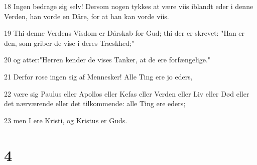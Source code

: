 \par 18 Ingen bedrage sig selv! Dersom nogen tykkes at være viis iblandt eder i denne Verden, han vorde en Dåre, for at han kan vorde viis.
\par 19 Thi denne Verdens Visdom er Dårskab for Gud; thi der er skrevet: "Han er den, som griber de vise i deres Træskhed;"
\par 20 og atter:"Herren kender de vises Tanker, at de ere forfængelige."
\par 21 Derfor rose ingen sig af Mennesker! Alle Ting ere jo eders,
\par 22 være sig Paulus eller Apollos eller Kefas eller Verden eller Liv eller Død eller det nærværende eller det tilkommende: alle Ting ere eders;
\par 23 men I ere Kristi, og Kristus er Guds.

\chapter{4}

